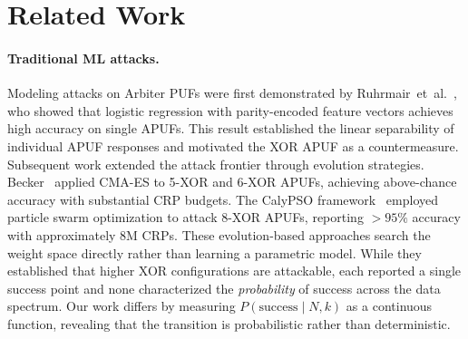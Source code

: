 \section{Related Work}
\label{sec:related_work}

\widefloatbegin
\centering
\caption{Comparison of representative modeling attack methods on XOR APUFs.
CRP budgets are approximate and reported at or near the transition midpoint.}
\label{tab:related_comparison}
\widefloatend

\paragraph{Traditional ML attacks.}
Modeling attacks on Arbiter PUFs were first demonstrated by
Ruhrmair~et~al.~\cite{ruhrmair2010modeling}, who showed that logistic regression
with parity-encoded feature vectors achieves high accuracy on single APUFs.
This result established the linear separability of individual APUF responses and
motivated the XOR APUF as a countermeasure.  Subsequent work extended the attack
frontier through evolution strategies.  Becker~\cite{becker2015cia} applied
CMA-ES to 5-XOR and 6-XOR APUFs, achieving above-chance accuracy with
substantial CRP budgets.  The CalyPSO
framework~\cite{calypso2024} employed particle swarm optimization to attack
8-XOR APUFs, reporting $>95\%$ accuracy with approximately 8M CRPs.  These
evolution-based approaches search the weight space directly rather than learning
a parametric model.  While they established that higher XOR configurations are
attackable, each reported a single success point and none characterized the
\emph{probability} of success across the data spectrum.  Our work differs by
measuring $P(\text{success} \mid N, k)$ as a continuous function, revealing that
the transition is probabilistic rather than deterministic.

